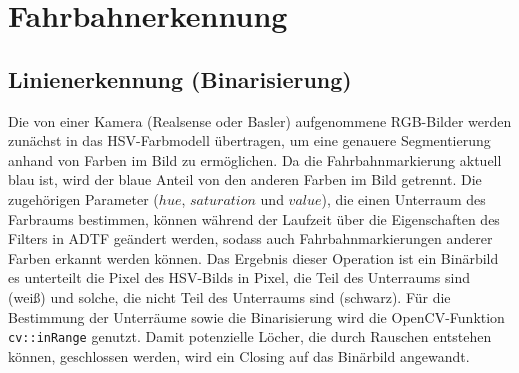 \documentclass[a4paper,12pt]{report}
\begin{document}
\chapter{Fahrbahnerkennung}



\section{Linienerkennung (Binarisierung)}	
	Die von einer Kamera (Realsense oder Basler) aufgenommene RGB-Bilder werden zunächst in das HSV-Farbmodell übertragen, um eine genauere Segmentierung anhand von Farben im Bild zu ermöglichen.
	Da die Fahrbahnmarkierung aktuell blau ist, wird der blaue Anteil von den anderen Farben im Bild getrennt. Die zugehörigen Parameter ($hue$, $saturation$ und $value$), die einen Unterraum des Farbraums bestimmen, können während der Laufzeit über die Eigenschaften des Filters in ADTF geändert werden, sodass auch Fahrbahnmarkierungen anderer Farben erkannt werden können.
	Das Ergebnis dieser Operation ist ein Binärbild es unterteilt die Pixel des HSV-Bilds in Pixel, die Teil des Unterraums sind (weiß) und solche, die nicht Teil des Unterraums sind (schwarz). Für die Bestimmung der Unterräume sowie die Binarisierung wird die OpenCV-Funktion \texttt{cv::inRange} genutzt.
	Damit potenzielle Löcher, die durch Rauschen entstehen können, geschlossen werden, wird ein Closing auf das Binärbild angewandt.
\end{document}
